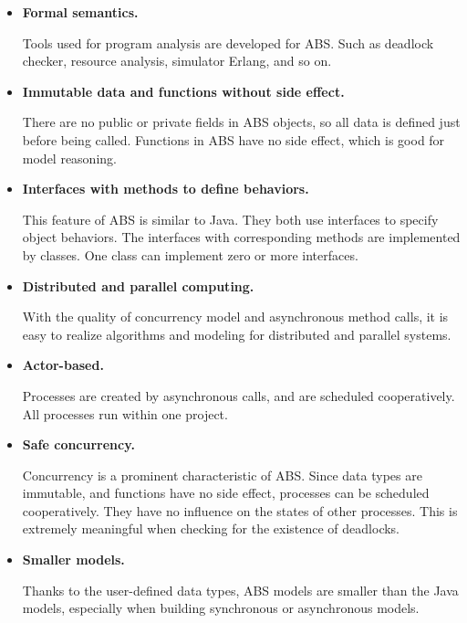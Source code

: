 \documentclass[article,dr=phil,type=msc,colorback,accentcolor=tud9c]{tudthesis}
\begin{document}
  \begin{itemize}
  	
  \item \textbf{Formal semantics.}

  Tools used for program analysis are developed for ABS. Such as deadlock checker, resource analysis, simulator Erlang, and so on. 
  	
  \item \textbf{Immutable data and functions without side effect.}
  
  There are no public or private fields in ABS objects, so all data is defined just before being called. Functions in ABS have no side effect, which is good for model reasoning.
  
  \item \textbf{Interfaces with methods to define behaviors.}

  This feature of ABS is similar to Java. They both use interfaces to specify object behaviors. The interfaces with corresponding methods are implemented by classes. One class can implement zero or more interfaces.
  
  \item \textbf{Distributed and parallel computing.}

  With the quality of concurrency model and asynchronous method calls, it is easy to realize algorithms and modeling for distributed and parallel systems.
  
  \item \textbf{Actor-based.}

  Processes are created by asynchronous calls, and are scheduled cooperatively. All processes run within one project.

  \item \textbf{Safe concurrency.}

  Concurrency is a prominent characteristic of ABS. Since data types are immutable, and functions have no side effect, processes can be scheduled cooperatively. They have no influence on the states of other processes. This is extremely meaningful when checking for the existence of deadlocks.
  
  \item \textbf{Smaller models.}
   
  Thanks to the user-defined data types, ABS models are smaller than the Java models, especially when building synchronous or asynchronous models.\cite{manualabs}
  

\end{itemize}
\end{document}
